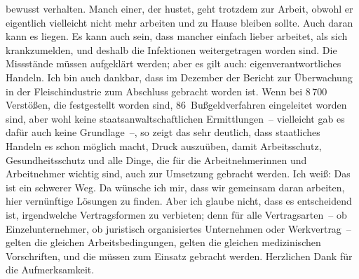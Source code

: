\documentclass{article}
\begin{document}
bewusst verhalten.  Manch einer, der hustet, geht trotzdem zur Arbeit, obwohl er eigentlich vielleicht nicht mehr arbeiten und zu Hause bleiben sollte. Auch daran kann es liegen.  Es kann auch sein, dass mancher einfach lieber arbeitet, als sich krankzumelden, und deshalb die Infektionen weitergetragen worden sind. Die Missstände müssen aufgeklärt werden; aber es gilt auch: eigenverantwortliches Handeln. Ich bin auch dankbar, dass im Dezember der Bericht zur Überwachung in der Fleischindustrie zum Abschluss gebracht worden ist. Wenn bei 8 700 Verstößen, die festgestellt worden sind, 86 Bußgeldverfahren eingeleitet worden sind, aber wohl keine staatsanwaltschaftlichen Ermittlungen – vielleicht gab es dafür auch keine Grundlage –, so zeigt das sehr deutlich, dass staatliches Handeln es schon möglich macht, Druck auszuüben, damit Arbeitsschutz, Gesundheitsschutz und alle Dinge, die für die Arbeitnehmerinnen und Arbeitnehmer wichtig sind, auch zur Umsetzung gebracht werden.  Ich weiß: Das ist ein schwerer Weg. Da wünsche ich mir, dass wir gemeinsam daran arbeiten, hier vernünftige Lösungen zu finden. Aber ich glaube nicht, dass es entscheidend ist, irgendwelche Vertragsformen zu verbieten; denn für alle Vertragsarten – ob Einzelunternehmer, ob juristisch organisiertes Unternehmen oder Werkvertrag –  gelten die gleichen Arbeitsbedingungen, gelten die gleichen medizinischen Vorschriften, und die müssen zum Einsatz gebracht werden. Herzlichen Dank für die Aufmerksamkeit.  
\end{document}
